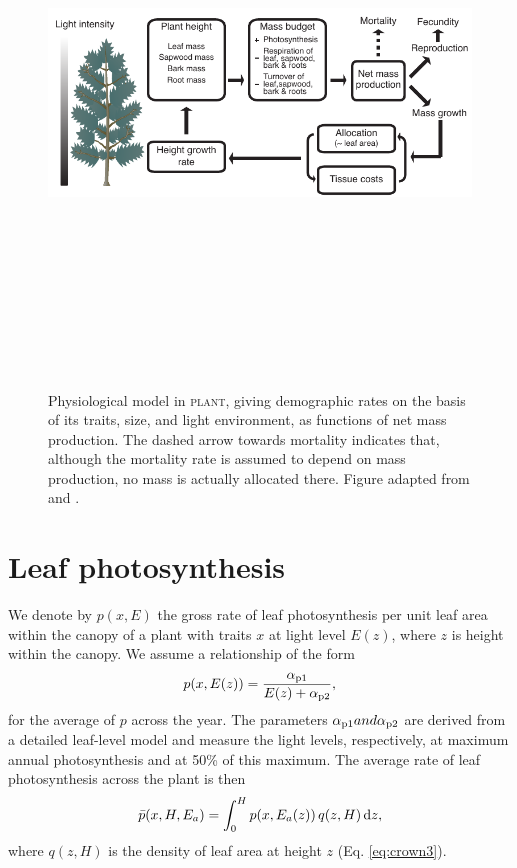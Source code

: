 \documentclass[10pt,twoside]{article}
\newcommand{\plant}{\textsc{plant}}
\begin{document}
\begin{figure}[h!]
\centering
\includegraphics[width=15cm,height=15cm,keepaspectratio]{../figures/schematic-phys}
\caption{Physiological model in {\plant}, giving
demographic rates on the basis of its traits, size, and light environment, as functions of
net mass production. The dashed arrow towards mortality indicates that, although the mortality rate is assumed to depend on mass production, no
mass is actually allocated there. Figure adapted from
\citet{Falster-2011} and \citet{Falster-2015}.}
\label{fig:schematic-phys}
\end{figure}

\section{Leaf photosynthesis}\label{leaf-photosynthesis}

We denote by \(p(x, E)\) the gross rate of leaf photosynthesis per unit
leaf area within the canopy of a plant with traits \(x\) at light
level \(E(z)\), where \(z\) is height within the canopy.
We assume a relationship of the form
\begin{equation}\label{eq:photosynthesis}
p(x, E(z)) = \frac{\alpha_{{\rm p1}}}{E(z) + \alpha_{{\rm p2}}},
\end{equation}
for the average of \(p\) across the year. The parameters
\(\alpha_{{\rm p1}} and \alpha_{{\rm p2}}\) are derived from a detailed leaf-level
model and measure the light levels, respectively, at maximum annual photosynthesis and at 50\% of this maximum. The average rate of
leaf photosynthesis across the plant is then
\begin{equation}\label{eq:photosynthesis_av}
\bar{p}(x, H, E_{a}) = \int_0^H p(x, E_a(z)) \, q(z, H) \, {\rm d}z,
\end{equation}
where \(q(z, H)\) is the density of leaf area at height \(z\) (Eq.
\ref{eq:crown3}).
\end{document}
